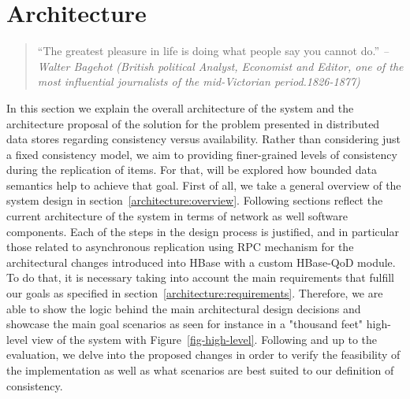 \chapter{Architecture}
\label{ch:architecture}

\begin{quotation}
“The greatest pleasure in life is doing what people say you cannot do.”
{\small\it -- Walter Bagehot (British political Analyst, Economist and Editor, one of the most influential journalists of the mid-Victorian period.1826-1877) }
\end{quotation}

In this section we explain the overall architecture of the system and the architecture proposal of the solution for the problem presented in distributed data stores regarding consistency versus availability. Rather than considering just a fixed consistency model, we aim to providing finer-grained levels of consistency during the replication of items. For that, will be explored how bounded data semantics help to achieve that goal. First of all, we take a general overview of the system design in section~\ref{architecture:overview}. Following sections reflect the current architecture of the system in terms of network as well software components. Each of the steps in the design process is justified, and in particular those related to asynchronous replication using RPC mechanism for the architectural changes introduced into HBase with a custom HBase-QoD module. To do that, it is necessary taking into account the main requirements that fulfill our goals as specified in section~\ref{architecture:requirements}. Therefore, we are able to show the logic behind the main architectural design decisions and showcase the main goal scenarios as seen for instance in a "thousand feet" high-level view of the system with Figure~\ref{fig-high-level}. Following and up to the evaluation, we delve into the proposed changes in order to verify the feasibility of the implementation as well as what scenarios are best suited to our definition of consistency.

